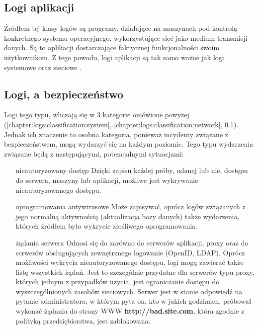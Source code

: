     \subsection{Logi aplikacji}
    \label{chapter:logs:classification:application}
    Źródłem tej klasy logów są programy, działające na maszynach pod kontrolą konkretnego
    systemu operacyjnego, wykorzystujące sieć jako medium transmisji danych. Są to
    aplikacji dostarczające faktycznej funkcjonalności swoim użytkownikom. Z tego powodu,
    logi aplikacji są tak samo ważne jak logi systemowe oraz sieciowe \cite{logging_log_management}. 
    
    \subsection{Logi, a bezpieczeństwo}
    \label{chapter:logs:classification:security}
    Logi tego typu, wliczają się w 3 kategorie omówione powyżej (\ref{chapter:logs:classification:system},
    \ref{chapter:logs:classification:network}, \ref{chapter:logs:classification:application}). Jednak
    ich znaczenie to osobna kategoria, ponieważ incydenty związane z bezpieczeństwem, mogą wydarzyć się
    na każdym poziomie. Tego typu wydarzenia związane będą z następującymi, potencjalnymi sytuacjami:
    \begin{itemize}
        \item[nieautoryzowany dostęp] Dzięki zapisu każdej próby, udanej lub nie, dostępu do serwera,
        maszyny lub aplikacji, możliwe jest wykrywanie nieautoryzowanego dostępu.
        \item[oprogramowania antywirusowe] Może zapisywać, oprócz logów związanych z jego normalną aktywnością
        (aktualizacja bazy danych) także wydarzenia, których źródłem było wykrycie złośliwego oprogramowania.
        \item[żądania serwera] Odnosi się do zarówno do serwerów aplikacji, proxy oraz do serwerów
        obsługujących zewnętrznego logowanie (OpenID, LDAP). Oprócz możliwości wykrycia nieautoryzowanego dostępu, logi mogą zawierać także listę wszystkich żądań. Jest to szczególnie przydatne dla serwerów
        typu proxy, których jednym z przypadków użycia, jest ograniczanie dostępu do wyszczególnionych zasobów
        sieciowych. Serwer jest w stanie odpowiedź na pytanie administratora, w którym pyta on, kto w jakich
        godzinach, próbował wykonać żądania do strony WWW \textbf{http://bad.site.com}, która zgodnie z
        polityką przedsiębiorstwa, jest zablokowana.
    \end{itemize}